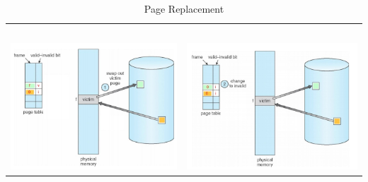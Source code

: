 \documentclass[a4paper]{scrreprt}
\begin{document}
\begin{table}
\caption{Page Replacement}
\centering
\begin{tabular}{cc}
\ \\
\includegraphics[scale=0.3]{graphics/pr1.png} & \includegraphics[scale=0.3]{graphics/pr2.png}\\


\end{tabular}
\end{table}
\end{document}
